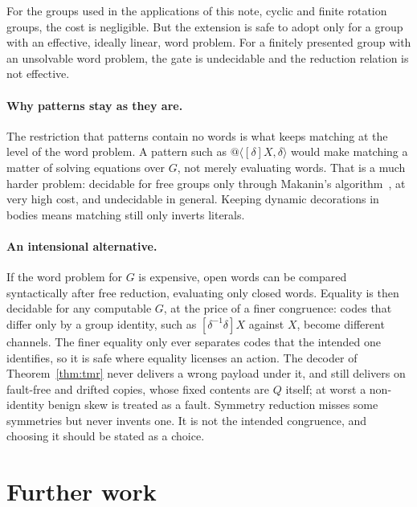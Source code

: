 \documentclass[11pt]{article}
\makeatletter
\theoremstyle{definition}
\theoremstyle{remark}
\newcommand{\qn}[2]{@\langle #1, #2\rangle}
\newcommand{\fr}[2]{[#1]#2}
\makeatother
\begin{document}
For the groups used in the applications of this note, cyclic and finite
rotation groups, the cost is negligible. But the extension is safe to adopt
only for a group with an effective, ideally linear, word problem. For a
finitely presented group with an unsolvable word problem, the gate is
undecidable and the reduction relation is not effective.

\paragraph{Why patterns stay as they are.}
The restriction that patterns contain no words is what keeps matching at the
level of the word problem. A pattern such as $\qn{\fr{\delta}{X}}{\delta}$
would make matching a matter of solving equations over $G$, not merely
evaluating words. That is a much harder problem: decidable for free groups
only through Makanin's algorithm~\cite{makanin}, at very high cost, and
undecidable in general. Keeping dynamic decorations in bodies means matching
still only inverts literals.

\paragraph{An intensional alternative.}
If the word problem for $G$ is expensive, open words can be compared
syntactically after free reduction, evaluating only closed words. Equality is
then decidable for any computable $G$, at the price of a finer congruence:
codes that differ only by a group identity, such as $\fr{\delta^{-1}\delta}{X}$
against $X$, become different channels. The finer equality only ever
separates codes that the intended one identifies, so it is safe where
equality licenses an action. The decoder of Theorem~\ref{thm:tmr} never
delivers a wrong payload under it, and still delivers on fault-free and
drifted copies, whose fixed contents are $Q$ itself; at worst a non-identity
benign skew is treated as a fault. Symmetry reduction misses some symmetries
but never invents one. It is not the intended congruence, and choosing it
should be stated as a choice.

\section{Further work}\label{sec:further}
\end{document}
